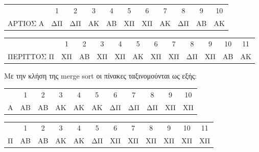 \documentclass[a4paper]{article}
\begin{document}
\begin{itemize}
\begin{center}
\begin{tabular}{r|c|c|c|c|c|c|c|c|c|c|}
\multicolumn{1}{r}{} & \multicolumn{1}{c}{1} & \multicolumn{1}{c}{2} & \multicolumn{1}{c}{3} & \multicolumn{1}{c}{4} & \multicolumn{1}{c}{5} & \multicolumn{1}{c}{6} & \multicolumn{1}{c}{7} & \multicolumn{1}{c}{8} & \multicolumn{1}{c}{9} & \multicolumn{1}{c}{10}\\
\cline{2-11}
ΑΡΤΙΟΣ Α& ΔΠ & ΔΠ & ΑΚ & ΑΒ & ΧΠ & ΧΠ & ΑΚ & ΔΠ & ΑΒ & ΑΚ\\
\cline{2-11}
\end{tabular}
\end{center}

\begin{center}
\begin{tabular}{r|c|c|c|c|c|c|c|c|c|c|c|}
\multicolumn{1}{r}{} & \multicolumn{1}{c}{1} & \multicolumn{1}{c}{2} & \multicolumn{1}{c}{3} & \multicolumn{1}{c}{4} & \multicolumn{1}{c}{5} & \multicolumn{1}{c}{6} & \multicolumn{1}{c}{7} & \multicolumn{1}{c}{8} & \multicolumn{1}{c}{9} & \multicolumn{1}{c}{10} & \multicolumn{1}{c}{11}\\
\cline{2-12}
ΠΕΡΙΤΤΟΣ Π& ΧΠ & ΑΒ & ΧΠ & ΧΠ & ΑΚ & ΧΠ & ΧΠ & ΔΠ & ΧΠ & ΑΒ & ΑΚ \\
\cline{2-12}
\end{tabular}
\end{center}

Με την κλήση της merge sort οι πίνακες ταξινομούνται ως εξής:

\begin{center}
\begin{tabular}{r|c|c|c|c|c|c|c|c|c|c|}
\multicolumn{1}{r}{} & \multicolumn{1}{c}{1} & \multicolumn{1}{c}{2} & \multicolumn{1}{c}{3} & \multicolumn{1}{c}{4} & \multicolumn{1}{c}{5} & \multicolumn{1}{c}{6} & \multicolumn{1}{c}{7} & \multicolumn{1}{c}{8} & \multicolumn{1}{c}{9} & \multicolumn{1}{c}{10}\\
\cline{2-11}
 Α& ΑΒ & ΑΒ & ΑΚ & ΑΚ & ΑΚ & ΔΠ & ΔΠ & ΔΠ & ΧΠ & ΧΠ\\
\cline{2-11}
\end{tabular}
\end{center}

\begin{center}
\begin{tabular}{r|c|c|c|c|c|c|c|c|c|c|c|}
\multicolumn{1}{r}{} & \multicolumn{1}{c}{1} & \multicolumn{1}{c}{2} & \multicolumn{1}{c}{3} & \multicolumn{1}{c}{4} & \multicolumn{1}{c}{5} & \multicolumn{1}{c}{6} & \multicolumn{1}{c}{7} & \multicolumn{1}{c}{8} & \multicolumn{1}{c}{9} & \multicolumn{1}{c}{10} & \multicolumn{1}{c}{11}\\
\cline{2-12}
 Π& ΑΒ & ΑΒ & ΑΚ & ΑΚ & ΔΠ & ΧΠ & ΧΠ & ΧΠ & ΧΠ & ΧΠ & ΧΠ \\
\cline{2-12}
\end{tabular}
\end{center}


\end{itemize}
\end{document}
